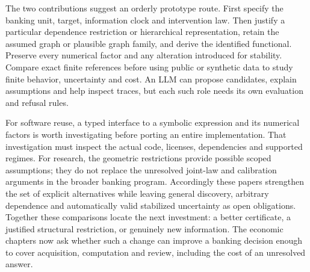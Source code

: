 The two contributions suggest an orderly prototype route. First specify
the banking unit, target, information clock and intervention law. Then
justify a particular dependence restriction or hierarchical representation,
retain the assumed graph or plausible graph family, and derive the
identified functional. Preserve every numerical factor and any alteration
introduced for stability. Compare exact finite references before using
public or synthetic data to study finite behavior, uncertainty and cost.
An LLM can propose candidates, explain assumptions and help inspect traces,
but each such role needs its own evaluation and refusal rules.

For software reuse, a typed interface to a symbolic expression and its
numerical factors is worth investigating before porting an entire
implementation. That investigation must inspect the actual code, licenses,
dependencies and supported regimes. For research, the geometric restrictions
provide possible scoped assumptions; they do not replace the unresolved
joint-law and calibration arguments in the broader banking program.
Accordingly these papers strengthen the set of explicit alternatives
while leaving general discovery, arbitrary dependence and automatically
valid stabilized uncertainty as open obligations. Together these comparisons locate the next investment: a better certificate, a justified structural restriction, or genuinely new information. The economic chapters now ask whether such a change can improve a banking decision enough to cover acquisition, computation and review, including the cost of an unresolved answer.
